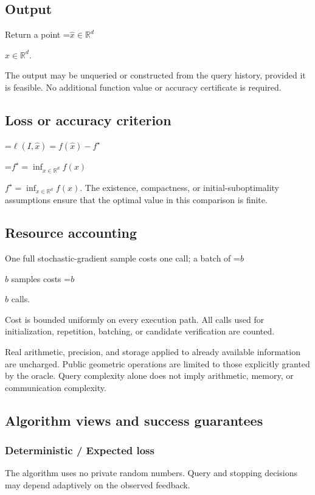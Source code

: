 \documentclass[10pt,a4paper]{article}
\newcommand{\AtlasMath}[1]{\par\begingroup\centering\setbox0=\hbox{$\displaystyle #1$}\ifdim\wd0>1.4\linewidth\typeout{ATLAS WIDE FORMULA: \the\wd0}\fi\ifdim\wd0>\linewidth\resizebox{\linewidth}{!}{\box0}\else\box0\fi\par\endgroup}
\newcommand{\AtlasInlineMath}[1]{\begingroup\setbox0=\hbox{$#1$}\ifdim\wd0>.4\linewidth\endgroup\AtlasMath{#1}\else\endgroup$#1$\fi}
\begin{document}
\subsection{Output}
Return a point \AtlasInlineMath{\widehat x\in\mathbb R^d}.

The output may be unqueried or constructed from the query history, provided it is feasible. No additional function value or accuracy certificate is required.

\subsection{Loss or accuracy criterion}

\AtlasMath{\ell(I,\widehat{x})=f(\widehat{x})-f^\star}


\AtlasInlineMath{f^\star=\inf_{x\in \mathbb{R}^d}f(x)}. The existence, compactness, or initial-suboptimality assumptions ensure that the optimal value in this comparison is finite.

\subsection{Resource accounting}
One full stochastic-gradient sample costs one call; a batch of \AtlasInlineMath{b} samples costs \AtlasInlineMath{b} calls.

Cost is bounded uniformly on every execution path. All calls used for initialization, repetition, batching, or candidate verification are counted.

Real arithmetic, precision, and storage applied to already available information are uncharged. Public geometric operations are limited to those explicitly granted by the oracle. Query complexity alone does not imply arithmetic, memory, or communication complexity.

\subsection{Algorithm views and success guarantees}
\subsubsection{Deterministic / Expected loss}
The algorithm uses no private random numbers. Query and stopping decisions may depend adaptively on the observed feedback.
\end{document}
